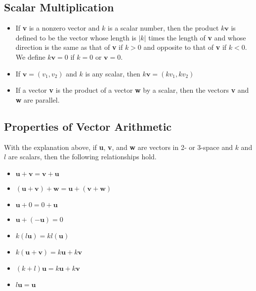 \documentclass[a4paper,12pt]{article}
\begin{document}
\subsection*{Scalar Multiplication}
\begin{itemize}
  \item If \textbf{v} is a nonzero vector and \(k\) is a scalar number, then the product \(k\textbf{v}\) is defined to be the vector whose length is \(|k|\) times the length of \textbf{v} and whose direction is the same as that of \textbf{v} if \(k>0\) and opposite to that of \textbf{v} if \(k<0\). We define \(k\textbf{v}=0\) if \(k=0\) or \(\textbf{v}=0\).
  \item If \(\textbf{v}=(v_1, v_2)\) and \(k\) is any scalar, then \(k\textbf{v}=(kv_1, kv_2)\)
  \item If a vector \textbf{v} is the product of a vector \textbf{w} by a scalar, then the vectors \textbf{v} and \textbf{w} are parallel.
\end{itemize}

\subsection*{Properties of Vector Arithmetic}
With the explanation above, if \textbf{u}, \textbf{v}, and \textbf{w} are vectors in 2- or 3-space and \(k\) and \(l\) are scalars, then the following relationships hold.
\begin{itemize}
  \item \(\textbf{u}+\textbf{v}=\textbf{v}+\textbf{u}\)
  \item \((\textbf{u}+\textbf{v})+\textbf{w}=\textbf{u}+(\textbf{v}+\textbf{w})\)
  \item \(\textbf{u}+0=0+\textbf{u}\)
  \item \(\textbf{u}+(-\textbf{u})=0\)
  \item \(k(l\textbf{u})=kl(\textbf{u})\)
  \item \(k(\textbf{u}+\textbf{v})=k\textbf{u}+k\textbf{v}\)
  \item \((k+l)\textbf{u}=k\textbf{u}+k\textbf{v}\)
  \item \(l\textbf{u}=\textbf{u}\)
\end{itemize}
\end{document}
